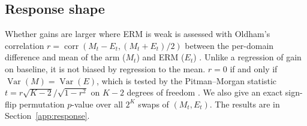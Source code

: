 \subsection{Response shape}
\label{sec:protocol-response}

Whether gains are larger where ERM is weak is assessed with Oldham's
correlation $r=\operatorname{corr}(M_t-E_t,(M_t+E_t)/2)$ between the
per-domain difference and mean of the arm ($M_t$) and ERM ($E_t$)
\citep{oldham1962}. Unlike a regression of gain on baseline, it is not biased
by regression to the mean.
$r=0$ if and only if $\operatorname{Var}(M)=\operatorname{Var}(E)$, which is
tested by the Pitman--Morgan statistic $t=r\sqrt{K-2}/\sqrt{1-r^2}$ on $K-2$
degrees of freedom \citep{pitman1939,morgan1939}. We also give an exact
sign-flip permutation $p$-value over all $2^K$ swaps of $(M_t,E_t)$. The results are in Section~\ref{app:response}.
